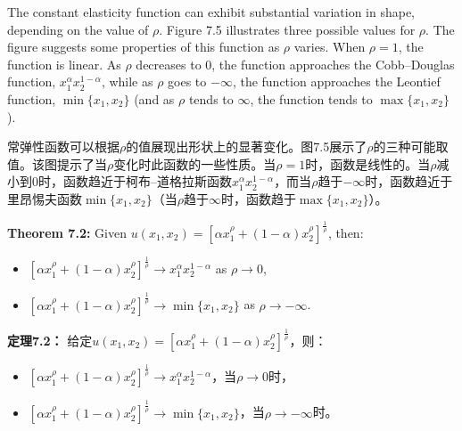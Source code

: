 \begin{original}
The constant elasticity function can exhibit substantial variation in shape, depending on the value of $\rho$. Figure 7.5 illustrates three possible values for $\rho$. The figure suggests some properties of this function as $\rho$ varies. When $\rho = 1$, the function is linear. As $\rho$ decreases to 0, the function approaches the Cobb--Douglas function, $x_1^\alpha x_2^{1-\alpha}$, while as $\rho$ goes to $-\infty$, the function approaches the Leontief function, $\min\{x_1, x_2\}$ (and as $\rho$ tends to $\infty$, the function tends to $\max\{x_1, x_2\}$).
\end{original}
\begin{translation}
常弹性函数可以根据$\rho$的值展现出形状上的显著变化。图7.5展示了$\rho$的三种可能取值。该图提示了当$\rho$变化时此函数的一些性质。当$\rho = 1$时，函数是线性的。当$\rho$减小到0时，函数趋近于柯布--道格拉斯函数$x_1^\alpha x_2^{1-\alpha}$，而当$\rho$趋于$-\infty$时，函数趋近于里昂惕夫函数$\min\{x_1, x_2\}$（当$\rho$趋于$\infty$时，函数趋于$\max\{x_1, x_2\}$）。
\end{translation}

\begin{original}
\textbf{Theorem 7.2:} Given $u(x_1, x_2) = [\alpha x_1^\rho + (1-\alpha) x_2^\rho]^{\frac{1}{\rho}}$, then:
\begin{itemize}
\item $[\alpha x_1^\rho + (1-\alpha) x_2^\rho]^{\frac{1}{\rho}} \to x_1^\alpha x_2^{1-\alpha}$ as $\rho \to 0$,
\item $[\alpha x_1^\rho + (1-\alpha) x_2^\rho]^{\frac{1}{\rho}} \to \min\{x_1, x_2\}$ as $\rho \to -\infty$.
\end{itemize}
\end{original}
\begin{translation}
\textbf{定理7.2：} 给定$u(x_1, x_2) = [\alpha x_1^\rho + (1-\alpha) x_2^\rho]^{\frac{1}{\rho}}$，则：
\begin{itemize}
\item $[\alpha x_1^\rho + (1-\alpha) x_2^\rho]^{\frac{1}{\rho}} \to x_1^\alpha x_2^{1-\alpha}$，当$\rho \to 0$时，
\item $[\alpha x_1^\rho + (1-\alpha) x_2^\rho]^{\frac{1}{\rho}} \to \min\{x_1, x_2\}$，当$\rho \to -\infty$时。
\end{itemize}
\end{translation}


